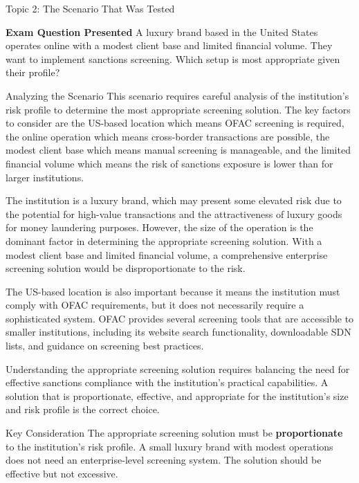 \documentclass[8pt]{beamer}  %
\begin{document}
	\begin{frame}{Topic 2: The Scenario That Was Tested}
		\begin{block}{\large \textbf{Exam Question Presented}}
			A luxury brand based in the United States operates online with a modest client base and limited financial volume. They want to implement sanctions screening. Which setup is most appropriate given their profile?
		\end{block}
		
		\vspace{0.2cm}
		\begin{block}{\large Analyzing the Scenario}
			This scenario requires careful analysis of the institution's risk profile to determine the most appropriate screening solution. The key factors to consider are the US-based location which means OFAC screening is required, the online operation which means cross-border transactions are possible, the modest client base which means manual screening is manageable, and the limited financial volume which means the risk of sanctions exposure is lower than for larger institutions.
			
			The institution is a luxury brand, which may present some elevated risk due to the potential for high-value transactions and the attractiveness of luxury goods for money laundering purposes. However, the size of the operation is the dominant factor in determining the appropriate screening solution. With a modest client base and limited financial volume, a comprehensive enterprise screening solution would be disproportionate to the risk.
			
			The US-based location is also important because it means the institution must comply with OFAC requirements, but it does not necessarily require a sophisticated system. OFAC provides several screening tools that are accessible to smaller institutions, including its website search functionality, downloadable SDN lists, and guidance on screening best practices.
			
			Understanding the appropriate screening solution requires balancing the need for effective sanctions compliance with the institution's practical capabilities. A solution that is proportionate, effective, and appropriate for the institution's size and risk profile is the correct choice.
		\end{block}
		
		\begin{alertblock}{Key Consideration}
			The appropriate screening solution must be \textbf{proportionate} to the institution's risk profile. A small luxury brand with modest operations does not need an enterprise-level screening system. The solution should be effective but not excessive.
		\end{alertblock}
	\end{frame}
	
\end{document}
